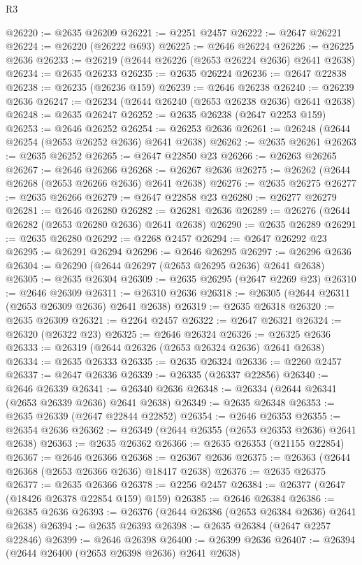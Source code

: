 \begin{lexlean}{R3}
\begin{coremodule}
@26220 := @2635 @26209
@26221 := @2251 @2457
@26222 := @2647 @26221
@26224 := @26220 (@26222 @693)
@26225 := @2646 @26224
@26226 := @26225 @2636
@26233 := @26219 (@2644 @26226 (@2653 @26224 @2636) @2641 @2638)
@26234 := @2635 @26233
@26235 := @2635 @26224
@26236 := @2647 @22838
@26238 := @26235 (@26236 @159)
@26239 := @2646 @26238
@26240 := @26239 @2636
@26247 := @26234 (@2644 @26240 (@2653 @26238 @2636) @2641 @2638)
@26248 := @2635 @26247
@26252 := @2635 @26238 (@2647 @2253 @159)
@26253 := @2646 @26252
@26254 := @26253 @2636
@26261 := @26248 (@2644 @26254 (@2653 @26252 @2636) @2641 @2638)
@26262 := @2635 @26261
@26263 := @2635 @26252
@26265 := @2647 @22850 @23
@26266 := @26263 @26265
@26267 := @2646 @26266
@26268 := @26267 @2636
@26275 := @26262 (@2644 @26268 (@2653 @26266 @2636) @2641 @2638)
@26276 := @2635 @26275
@26277 := @2635 @26266
@26279 := @2647 @22858 @23
@26280 := @26277 @26279
@26281 := @2646 @26280
@26282 := @26281 @2636
@26289 := @26276 (@2644 @26282 (@2653 @26280 @2636) @2641 @2638)
@26290 := @2635 @26289
@26291 := @2635 @26280
@26292 := @2268 @2457
@26294 := @2647 @26292 @23
@26295 := @26291 @26294
@26296 := @2646 @26295
@26297 := @26296 @2636
@26304 := @26290 (@2644 @26297 (@2653 @26295 @2636) @2641 @2638)
@26305 := @2635 @26304
@26309 := @2635 @26295 (@2647 @2269 @23)
@26310 := @2646 @26309
@26311 := @26310 @2636
@26318 := @26305 (@2644 @26311 (@2653 @26309 @2636) @2641 @2638)
@26319 := @2635 @26318
@26320 := @2635 @26309
@26321 := @2264 @2457
@26322 := @2647 @26321
@26324 := @26320 (@26322 @23)
@26325 := @2646 @26324
@26326 := @26325 @2636
@26333 := @26319 (@2644 @26326 (@2653 @26324 @2636) @2641 @2638)
@26334 := @2635 @26333
@26335 := @2635 @26324
@26336 := @2260 @2457
@26337 := @2647 @26336
@26339 := @26335 (@26337 @22856)
@26340 := @2646 @26339
@26341 := @26340 @2636
@26348 := @26334 (@2644 @26341 (@2653 @26339 @2636) @2641 @2638)
@26349 := @2635 @26348
@26353 := @2635 @26339 (@2647 @22844 @22852)
@26354 := @2646 @26353
@26355 := @26354 @2636
@26362 := @26349 (@2644 @26355 (@2653 @26353 @2636) @2641 @2638)
@26363 := @2635 @26362
@26366 := @2635 @26353 (@21155 @22854)
@26367 := @2646 @26366
@26368 := @26367 @2636
@26375 := @26363 (@2644 @26368 (@2653 @26366 @2636) @18417 @2638)
@26376 := @2635 @26375
@26377 := @2635 @26366
@26378 := @2256 @2457
@26384 := @26377 (@2647 (@18426 @26378 @22854 @159) @159)
@26385 := @2646 @26384
@26386 := @26385 @2636
@26393 := @26376 (@2644 @26386 (@2653 @26384 @2636) @2641 @2638)
@26394 := @2635 @26393
@26398 := @2635 @26384 (@2647 @2257 @22846)
@26399 := @2646 @26398
@26400 := @26399 @2636
@26407 := @26394 (@2644 @26400 (@2653 @26398 @2636) @2641 @2638)

\end{coremodule}
\end{lexlean}
